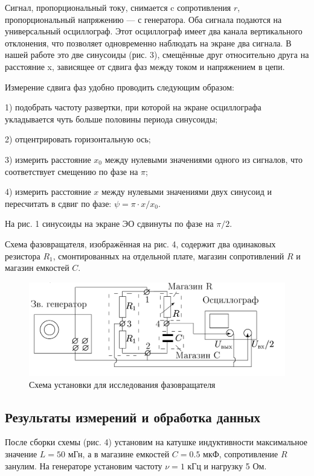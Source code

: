 \documentclass[12pt,a4paper]{article}
\begin{document}
Сигнал, пропорциональный току, снимается c сопротивления $r$, пропорциональный напряжению — с генератора. 
Оба сигнала подаются на универсальный осциллограф. 
Этот осциллограф имеет два канала вертикального отклонения, что позволяет одновременно наблюдать на экране два сигнала. 
В нашей работе это две синусоиды (рис. 3), смещённые друг относительно друга на расстояние x, зависящее от сдвига фаз между током и напряжением в цепи.

Измерение сдвига фаз удобно проводить следующим образом:
     
1) подобрать частоту развертки, при которой на экране осциллографа укладывается чуть больше половины периода синусоиды;
    
2) отцентрировать горизонтальную ось; 

3) измерить расстояние $x_0$ между нулевыми значениями одного из сигналов, что соответствует смещению по фазе на $\pi$;

4) измерить расстояние $x$ между нулевыми значениями двух синусоид и пересчитать в сдвиг по фазе: $\psi = \pi \cdot x/x_0$.

На рис. 1 синусоиды на экране ЭО сдвинуты по фазе на $\pi/2$.

Схема фазовращателя, изображённая на рис. 4, содержит два одинаковых резистора $R_1$, смонтированных на отдельной плате, магазин сопротивлений $R$ и магазин емкостей $C$.

\begin{figure}[h]
    \centering
    \includegraphics[width=0.7\linewidth]{pics/scheme2.png}
    \caption{Схема установки для исследования фазовращателя}
\end{figure}

\subsection*{Результаты измерений и обработка данных}
После сборки схемы (рис. 4) установим на катушке индуктивности максимальное значение $L = 50$ мГн, а в магазине емкостей $C = 0.5$ мкФ, сопротивление $R$ занулим.
На генераторе установим частоту $\nu = 1$ кГц и нагрузку 5 Ом.
\end{document}
